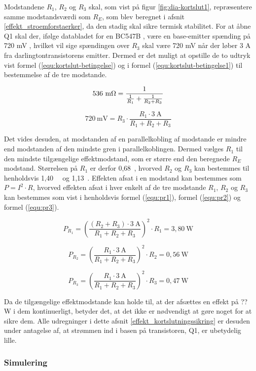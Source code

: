Modstandene $R_1$, $R_2$ og $R_3$ skal, som vist på figur \ref{fig:dia-kortslut1}, repræsentere samme modstandsværdi som $R_E$, som blev beregnet i afsnit \ref{effekt_stroemforstaerker}, da den stadig skal sikre termisk stabilitet. For at åbne Q1 skal der, ifølge databladet for en BC547B \cite{bc547b-datablad}, være en base-emitter spænding på 720 mV , hvilket vil sige spændingen over $R_3$ skal være 720 mV når der løber 3 A fra darlingtontransistorens emitter. Dermed er det muligt at opstille de to udtryk vist formel (\ref{equ:kortslut-betingelse}) og i formel (\ref{equ:kortslut-betingelse1}) til bestemmelse af de tre modstande.

\begin{equation}
\label{equ:kortslut-betingelse}
\mathrm{536~m\ohm} = \frac{1}{\frac{1}{R_1}+\frac{1}{R_2 + R_3}}
\end{equation}

\begin{equation}
\label{equ:kortslut-betingelse1}
\mathrm{720~mV} = R_3 \cdot \frac{R_1 \cdot \mathrm{3~A}}{R_ 1+ R_2 + R_3}
\end{equation}

Det vides desuden, at modstanden af en parallelkobling af modstande er mindre end modstanden af den mindste gren i parallelkoblingen. Dermed vælges $R_1$ til den mindste tilgængelige effektmodstand, som er større end den beregnede $R_E$ modstand. Størrelsen på $R_1$ er derfor 0,68~\ohm, hvorved $R_2$ og $R_3$ kan bestemmes til henholdsvis 1,40~\ohm~ og 1,13~\ohm. Effekten afsat i en modstand kan bestemmes som $P = I^2 \cdot R$, hvorved effekten afsat i hver enkelt af de tre modstande $R_1$, $R_2$ og $R_3$ kan bestemmes som vist i henholdsvis formel (\ref{equ:pr1}), formel (\ref{equ:pr2}) og formel (\ref{equ:pr3}).

\begin{equation}
\label{equ:pr1}
P_{R_1} = \left(\frac{(R_2 + R_3) \cdot \mathrm{3~A}}{R_1 + R_2 + R_3}\right)^2 \cdot R_1 = \mathrm{3,80~W}
\end{equation}

\begin{equation}
\label{equ:pr2}
P_{R_2} = \left(\frac{R_1 \cdot \mathrm{3~A}}{R_1 + R_2 + R_3}\right)^2 \cdot R_2 = \mathrm{0,56~W}
\end{equation}

\begin{equation}
\label{equ:pr3}
P_{R_3} = \left(\frac{R_1 \cdot \mathrm{3~A}}{R_1 + R_2 + R_3}\right)^2 \cdot R_3 = \mathrm{0,47~W}
\end{equation}

Da de tilgængelige effektmodstande kan holde til, at der afsættes en effekt på ?? W i dem kontinuerligt, betyder det, at det ikke er nødvendigt at gøre noget for at sikre dem. Alle udregninger i dette afsnit \ref{effekt_kortslutningssikring} er desuden under antagelse af, at strømmen ind i basen på transistoren, Q1, er ubetydelig lille.

\subsubsection*{Simulering}